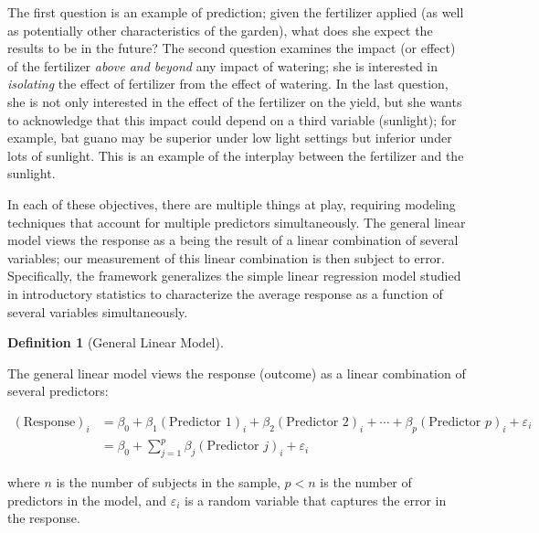 \documentclass[
  letterpaper,
  DIV=11,
  numbers=noendperiod]{scrreprt}
\theoremstyle{definition}
\theoremstyle{definition}
\newtheorem{definition}{Definition}[chapter]
\theoremstyle{remark}
\begin{document}
The first question is an example of prediction; given the fertilizer
applied (as well as potentially other characteristics of the garden),
what does she expect the results to be in the future? The second
question examines the impact (or effect) of the fertilizer \emph{above
and beyond} any impact of watering; she is interested in
\emph{isolating} the effect of fertilizer from the effect of watering.
In the last question, she is not only interested in the effect of the
fertilizer on the yield, but she wants to acknowledge that this impact
could depend on a third variable (sunlight); for example, bat guano may
be superior under low light settings but inferior under lots of
sunlight. This is an example of the interplay between the fertilizer and
the sunlight.

In each of these objectives, there are multiple things at play,
requiring modeling techniques that account for multiple predictors
simultaneously. The general linear model views the response as a being
the result of a linear combination of several variables; our measurement
of this linear combination is then subject to error. Specifically, the
framework generalizes the simple linear regression model studied in
introductory statistics to characterize the average response as a
function of several variables simultaneously.

\begin{definition}[General Linear
Model]\protect\hypertarget{def-general-linear-model}{}\label{def-general-linear-model}

The general linear model views the response (outcome) as a linear
combination of several predictors:

\[
\begin{aligned}
  (\text{Response})_i 
    &= \beta_0 + \beta_1 (\text{Predictor 1})_{i} + \beta_2 (\text{Predictor 2})_{i} + \dotsb + 
      \beta_p (\text{Predictor } p)_{i} + \varepsilon_i \\
    &= \beta_0 + \sum\limits_{j=1}^{p} \beta_j (\text{Predictor } j)_{i} + \varepsilon_i
\end{aligned}
\]

where \(n\) is the number of subjects in the sample, \(p < n\) is the
number of predictors in the model, and \(\varepsilon_i\) is a random
variable that captures the error in the response.

\end{definition}
\end{document}
